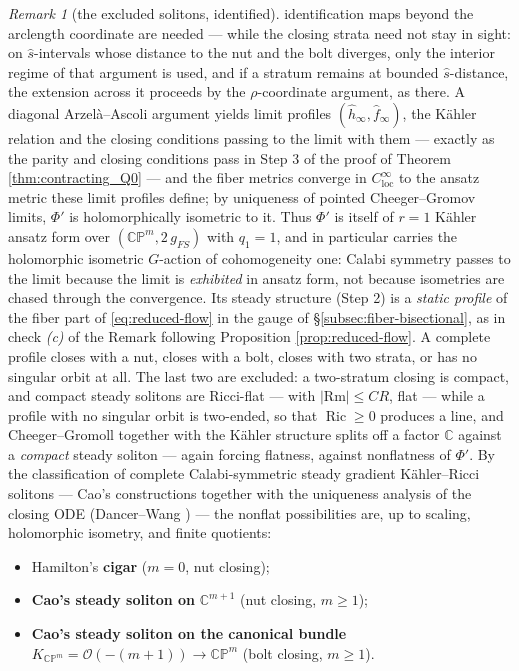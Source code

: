 \documentclass[11pt]{amsart}
\theoremstyle{plain}
\numberwithin{equation}{section}
\theoremstyle{definition}
\theoremstyle{remark}
\newtheorem*{remarkx}{Remark}
\begin{document}
\begin{remarkx}[the excluded solitons, identified]
identification maps beyond the arclength coordinate are needed --- while the closing strata need not stay in sight: on $\hat{s}$-intervals whose distance to the nut and the bolt diverges, only the interior regime of that argument is used, and if a stratum remains at bounded $\hat{s}$-distance, the extension across it proceeds by the $\rho$-coordinate argument, as there. A diagonal Arzelà--Ascoli argument yields limit profiles $( \hat{h}_\infty, \hat{f}_\infty )$, the Kähler relation and the closing conditions passing to the limit with them --- exactly as the parity and closing conditions pass in Step 3 of the proof of Theorem \ref{thm:contracting_Q0} --- and the fiber metrics converge in $C^\infty_{\mathrm{loc}}$ to the ansatz metric these limit profiles define; by uniqueness of pointed Cheeger--Gromov limits, $\Phi'$ is holomorphically isometric to it. Thus $\Phi'$ is itself of $r = 1$ Kähler ansatz form over $( \mathbb{CP}^m, 2\, g_{FS} )$ with $q_1 = 1$, and in particular carries the holomorphic isometric $G$-action of cohomogeneity one: Calabi symmetry passes to the limit because the limit is \emph{exhibited} in ansatz form, not because isometries are chased through the convergence. Its steady structure (Step 2) is a \emph{static profile} of the fiber part of \eqref{eq:reduced-flow} in the gauge of \S\ref{subsec:fiber-bisectional}, as in check \emph{(c)} of the Remark following Proposition \ref{prop:reduced-flow}. A complete profile closes with a nut, closes with a bolt, closes with two strata, or has no singular orbit at all. The last two are excluded: a two-stratum closing is compact, and compact steady solitons are Ricci-flat --- with $| \mathrm{Rm} | \leq C R$, flat --- while a profile with no singular orbit is two-ended, so that $\operatorname{Ric} \geq 0$ produces a line, and Cheeger--Gromoll together with the Kähler structure splits off a factor $\mathbb{C}$ against a \emph{compact} steady soliton --- again forcing flatness, against nonflatness of $\Phi'$. By the classification of complete Calabi-symmetric steady gradient Kähler--Ricci solitons --- Cao's constructions \cite{Cao96} together with the uniqueness analysis of the closing ODE (Dancer--Wang \cite{DW2011}) --- the nonflat possibilities are, up to scaling, holomorphic isometry, and finite quotients:
	
	\begin{itemize}
		\item Hamilton's \textbf{cigar} ($m = 0$, nut closing);
		\item \textbf{Cao's steady soliton on} $\mathbb{C}^{m + 1}$ (nut closing, $m \geq 1$);
		\item \textbf{Cao's steady soliton on the canonical bundle} $K_{\mathbb{CP}^m} = \mathcal{O} ( - ( m + 1 ) ) \to \mathbb{CP}^m$ (bolt closing, $m \geq 1$).
	\end{itemize}
	

\end{remarkx}
\end{document}
